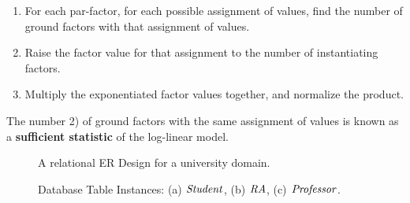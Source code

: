 \documentclass{IEEEtran}
\begin{document}
\begin{enumerate}
\item For each par-factor, for each possible assignment of values, find the number of ground factors with that assignment of values.
\item Raise the factor value for that assignment to the number of instantiating factors.
\item Multiply the exponentiated factor values together, and normalize the product. 
\end{enumerate}

The number 2) of ground factors with the same assignment of values is known as a \textbf{sufficient statistic} of the log-linear model. 

\begin{figure}[htbp] %
 \centering
{} 
\caption{A relational ER Design for a university domain.}
 \label{fig:university-schema}
\end{figure}
\begin{figure}[htbp] %
 \centering
{} 
\caption{Database Table Instances: (a) $\mathit{Student}$, (b) $\mathit{RA}$, (c) $\mathit{Professor}$. }
 \label{fig:instance}
\end{figure}
\end{document}
